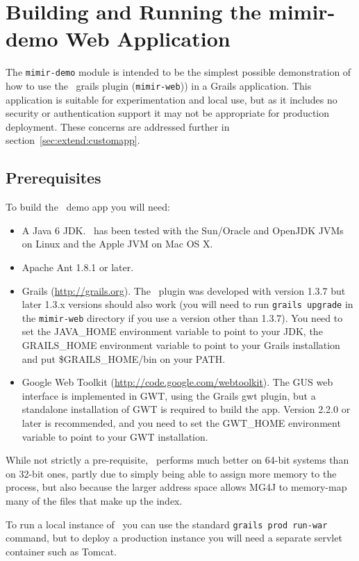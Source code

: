 \section{Building and Running the mimir-demo Web
Application}\label{sec:building}

The {\tt mimir-demo} module is intended to be the simplest possible
demonstration of how to use the \Mimir\ grails plugin ({\tt mimir-web})) in a
Grails application. This application is suitable for experimentation and local
use, but as it includes no security or authentication support it may not be
appropriate for production deployment.  These concerns are addressed further in
section~\ref{sec:extend:customapp}.

\subsection{Prerequisites}

To build the \Mimir\ demo app you will need:
\begin{itemize}
\item A Java 6 JDK.  \Mimir\ has been tested with the Sun/Oracle and OpenJDK
  JVMs on Linux and the Apple JVM on Mac OS X.
\item Apache Ant 1.8.1 or later.
\item Grails (\url{http://grails.org}).  The \Mimir\ plugin was developed with
version 1.3.7 but later 1.3.x versions should also work (you will need to run
{\tt grails upgrade} in the {\tt mimir-web} directory if you use a version other
than 1.3.7).  You need to set the JAVA\_HOME environment variable to point to
your JDK, the GRAILS\_HOME environment variable to point to your Grails
installation and put \$GRAILS\_HOME/bin on your PATH. 
\item Google Web Toolkit (\url{http://code.google.com/webtoolkit}).  The GUS
  web interface is implemented in GWT, using the Grails gwt plugin, but a
  standalone installation of GWT is required to build the app.  Version 2.2.0
  or later is recommended, and you need to set the GWT\_HOME environment
  variable to point to your GWT installation.
\end{itemize}

While not strictly a pre-requisite, \Mimir\ performs much better on 64-bit
systems than on 32-bit ones, partly due to simply being able to assign more
memory to the process, but also because the larger address space allows MG4J to
memory-map many of the files that make up the index.

To run a local instance of \Mimir\ you can use the standard {\tt grails prod
run-war} command, but to deploy a production instance you will need a separate
servlet container such as Tomcat.

